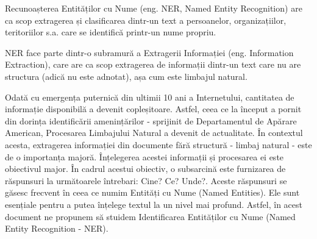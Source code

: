
Recunoașterea Entităților cu Nume (eng. NER, Named Entity Recognition) are ca scop extragerea și clasificarea dintr-un text a persoanelor, organizațiilor, teritoriilor s.a. care se identifică printr-un nume propriu.

NER face parte dintr-o subramură a Extragerii Informației (eng. Information Extraction), care are ca scop extragerea de informații dintr-un text care nu are structura (adică nu este adnotat), așa cum este limbajul natural.


Odată cu emergența puternică din ultimii 10 ani a Internetului, cantitatea de informație disponibilă a devenit copleșitoare. Astfel, ceea ce la început a pornit din dorința identificării amenințărilor - sprijinit de Departamentul de Apărare American, Procesarea Limbajului Natural a devenit de actualitate. În contextul acesta, extragerea informației din documente fără structură - limbaj natural - este de o importanța majoră. Înțelegerea acestei informații și procesarea ei este obiectivul major. În cadrul acestui obiectiv, o subsarcină este furnizarea de răspunsuri la următoarele întrebari: Cine? Ce? Unde?. Aceste răspunsuri se găsesc frecvent în ceea ce numim Entități cu Nume (Named Entities). Ele sunt esențiale pentru a putea înțelege textul la un nivel mai profund. Astfel, în acest document ne propunem să stuidem Identificarea Entităților cu Nume (Named Entity Recognition - NER).
